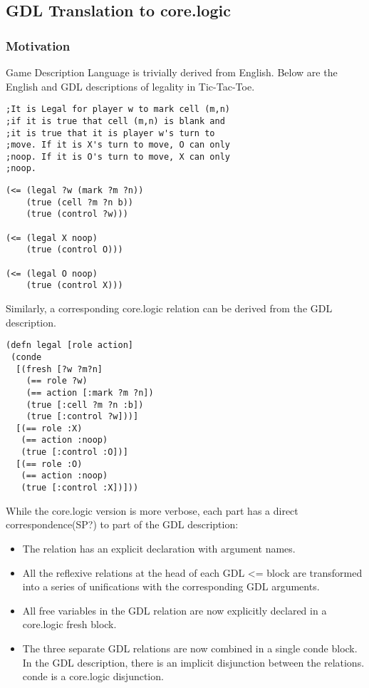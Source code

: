 \documentclass[letterpaper]{article}
\begin{document}
\subsection{GDL Translation to core.logic}
\subsubsection{Motivation}
Game Description Language is trivially derived from English. Below are the English and GDL descriptions of legality in Tic-Tac-Toe.
\begin{lstlisting}[frame=single, caption=The Legal relation for Tic-Tac-Toe expressed in English]
;It is Legal for player w to mark cell (m,n)
;if it is true that cell (m,n) is blank and
;it is true that it is player w's turn to
;move. If it is X's turn to move, O can only
;noop. If it is O's turn to move, X can only
;noop. 
\end{lstlisting}
\begin{lstlisting}[frame=single, caption=The Legal relation for Tic-Tac-Toe expressed in GDL]
(<= (legal ?w (mark ?m ?n))
    (true (cell ?m ?n b))
    (true (control ?w)))

(<= (legal X noop)
    (true (control O)))

(<= (legal O noop)
    (true (control X)))
\end{lstlisting}

Similarly, a corresponding core.logic relation can be derived from the GDL description.

\begin{lstlisting}[frame=single, caption=The Legal relation translated into core.logic]
(defn legal [role action]
 (conde
  [(fresh [?w ?m?n]
    (== role ?w)
    (== action [:mark ?m ?n])
    (true [:cell ?m ?n :b])
    (true [:control ?w]))]
  [(== role :X)
   (== action :noop)
   (true [:control :O])]
  [(== role :O)
   (== action :noop)
   (true [:control :X])]))
\end{lstlisting}

While the core.logic version is more verbose, each part has a direct correspondence(SP?) to part of the GDL description:
\begin{itemize}
\item The relation has an explicit declaration with argument names.
\item All the reflexive relations at the head of each GDL \textless= block are transformed into a series of unifications with the corresponding GDL arguments. 
\item All free variables in the GDL relation are now explicitly declared in a core.logic fresh block.
\item The three separate GDL relations are now combined in a single conde block. In the GDL description, there is an implicit disjunction between the relations. conde is a core.logic disjunction.
\end{itemize}
\end{document}
